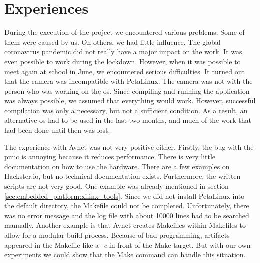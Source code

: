 \chapter*{Experiences}
\label{ch:experiences}

During the execution of the project we encountered various problems.
Some of them were caused by us.
On others, we had little influence.
The global coronavirus pandemic did not really have a major impact on the work.
It was even possible to work during the lockdown.
However, when it was possible to meet again at school in June, we encountered serious difficulties.
It turned out that the camera was incompatible with PetaLinux.
The camera was not with the person who was working on the \acrlong{os}.
Since compiling and running the application was always possible, we assumed that everything would work.
However, successful compilation was only a necessary, but not a sufficient condition.
As a result, an alternative \acrlong{os} had to be used in the last two months, and much of the work that had been done until then was lost. 

The experience with Avnet was not very positive either.
Firstly, the bug with the \acrshort{pmic} is annoying because it reduces performance.
There is very little documentation on how to use the hardware.
There are a few examples on Hackster.io, but no technical documentation exists.
Furthermore, the written scripts are not very good.
One example was already mentioned in section \ref{sec:embedded_platform:xilinx_tools}.
Since we did not install PetaLinux into the default directory, the Makefile could not be completed.
Unfortunately, there was no error message and the log file with about \num{10000} lines had to be searched manually.
Another example is that Avnet creates Makefiles within Makefiles to allow for a modular build process.
Because of bad programming, artifacts appeared in the Makefile like a \textit{-e} in front of the Make target.
But with our own experiments we could show that the Make command can handle this situation.

